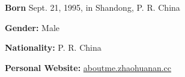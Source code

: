 \textbf{Born} Sept. 21, 1995, in Shandong, P. R. China

\textbf{Gender:} Male

\textbf{Nationality:} P. R. China

\textbf{Personal Website:} \href{http://aboutme.zhaohuanan.cc}{aboutme.zhaohuanan.cc}  